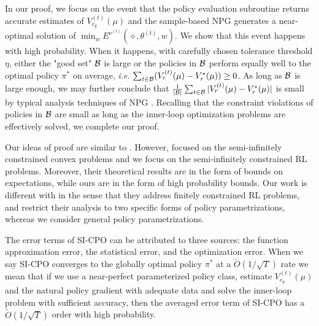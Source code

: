 In our proof, we focus on the event that the policy evaluation subroutine returns accurate estimates of $V^{(t)}_{c_y}(\mu)$ and the sample-based NPG generates a near-optimal solution of $\min_w E^{\nu^{(t)}}(\diamond,\theta^{(t)},w)$.
We show that this event happens with high probability.
When it happens, with carefully chosen tolerance threshold $\eta$, either the "good set" ${\mathcal{B}}$ is large or the policies in ${\mathcal{B}}$ perform equally well to the optimal policy $\pi^*$ on average, \textit{i.e.} $\sum_{t\in{\mathcal{B}}}(V^{(t)}_r(\mu)-V^*_r(\mu))\geq 0$.
As long as ${\mathcal{B}}$ is large enough, we may further conclude that  $\frac{1}{|{\mathcal{B}}|}\sum_{t\in{\mathcal{B}}}|V^{(t)}_r(\mu)-V^*_r(\mu)|$ is small by typical analysis techniques of NPG \citep{agarwal2021theory}.
Recalling that the constraint violations of policies in ${\mathcal{B}}$ are small as long as the inner-loop optimization problems are effectively solved, we complete our proof.

Our ideas of proof are similar to \cite{wei2020comirror, xu2021crpo}.
However, \cite{wei2020comirror} focused on the semi-infinitely constrained convex problems and we focus on the semi-infinitely constrained RL problems.
Moreover, their theoretical results are in the form of bounds on expectations, while ours are in the form of high probability bounds.
Our work is different with \cite{xu2021crpo} in the sense that they address finitely constrained RL problems, and restrict their analysis to two specific forms of policy parametrizations, whereas we consider general policy parametrizations.

\begin{remark}
The error terms of SI-CPO can be attributed to three sources: the function approximation error, the statistical error, and the optimization error.
When we say SI-CPO converges to the globally optimal policy $\pi^*$ at a $\widetilde {O}(1/\sqrt{T})$ rate we mean that if we use a near-perfect parameterized policy class, estimate $V^{(t)}_{c_y}(\mu)$ and the natural policy gradient with adequate data and solve the inner-loop problem with sufficient accuracy, then the averaged error term of SI-CPO has a $\widetilde O(1/\sqrt{T})$ order with high probability.
\end{remark}

